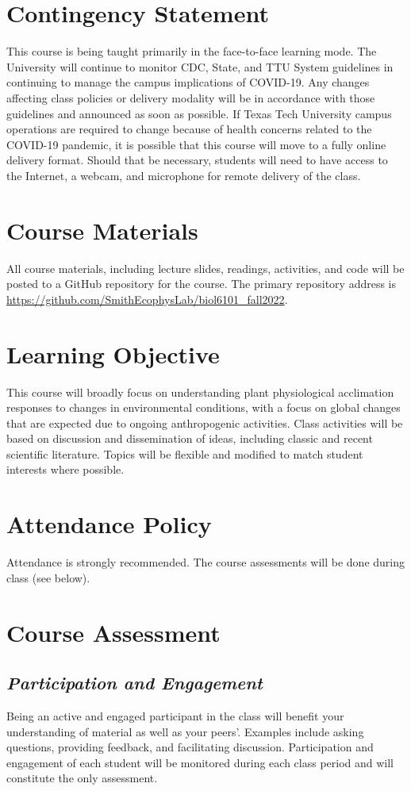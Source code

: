 \documentclass[12pt, notitlepage]{article}   	%
\begin{document}
{\section{Contingency Statement}
This course is being taught primarily in the face-to-face learning mode. 
The University will continue to monitor CDC, State, and TTU System guidelines in 
continuing to manage the campus implications of COVID-19. 
Any changes affecting class policies or delivery modality will be in accordance with 
those guidelines and announced as soon as possible. 
If Texas Tech University campus operations are required to change because of health 
concerns related to the COVID-19 pandemic, it is possible that this course will move 
to a fully online delivery format. 
Should that be necessary, students will need to have access to the Internet, a webcam, 
and microphone for remote delivery of the class. 

\section{Course Materials}
All course materials, including lecture slides, readings, activities, and code 
will be posted to a GitHub repository for the course.
The primary repository address is
\url{https://github.com/SmithEcophysLab/biol6101_fall2022}.

\section{Learning Objective}
This course will broadly focus on understanding plant physiological acclimation
responses to changes in environmental conditions, with a focus on global changes
that are expected due to ongoing anthropogenic activities.
Class activities will be based on discussion and dissemination of ideas, 
including classic and recent scientific literature. 
Topics will be flexible and modified to match student interests where possible.

\section{Attendance Policy}
Attendance is strongly recommended. 
The course assessments will be done during class (see below).

\section{Course Assessment}
\subsection{\textit{Participation and Engagement}}
Being an active and engaged participant in the class will benefit your understanding
of material as well as your peers'. Examples include asking questions, providing feedback,
and facilitating discussion. Participation and engagement of each student will be monitored
during each class period and will constitute the only assessment.

}
\end{document}
